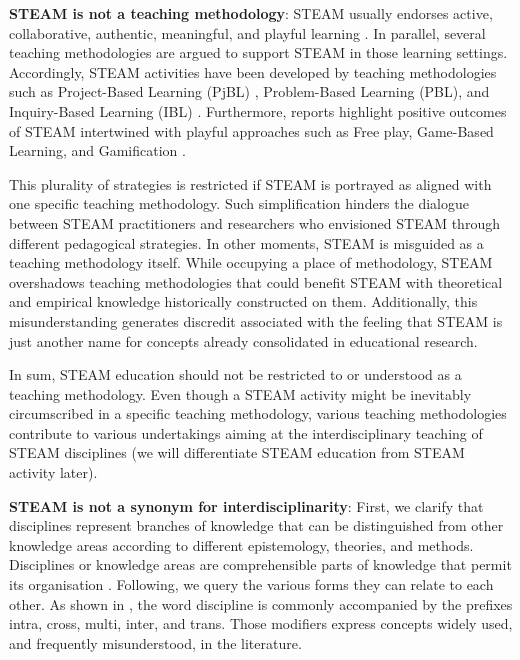 \documentclass[english]{textolivre}
\begin{document}
\textbf{STEAM is not a teaching methodology}: STEAM usually endorses active, collaborative, authentic, meaningful, and playful learning \cite{michael_wheres_2006, zosh_accessing_2018}. In parallel, several teaching methodologies are argued to support STEAM in those learning settings. Accordingly, STEAM activities have been developed by teaching methodologies such as Project-Based Learning (PjBL) \cite{lu_project-based_2022}, Problem-Based Learning (PBL), and Inquiry-Based Learning (IBL) \cite{quigley_developing_2017}. Furthermore, reports highlight positive outcomes of STEAM intertwined with playful approaches such as Free play, Game-Based Learning, and Gamification \cite{aurava_expectations_2022, rodrigues2022aamatematicas}.

This plurality of strategies is restricted if STEAM is portrayed as aligned with one specific teaching methodology. Such simplification hinders the dialogue between STEAM practitioners and researchers who envisioned STEAM through different pedagogical strategies. In other moments, STEAM is misguided as a teaching methodology itself. While occupying a place of methodology, STEAM overshadows teaching methodologies that could benefit STEAM with theoretical and empirical knowledge historically constructed on them. Additionally, this misunderstanding generates discredit associated with the feeling that STEAM is just another name for concepts already consolidated in educational research.

In sum, STEAM education should not be restricted to or understood as a teaching methodology. Even though a STEAM activity might be inevitably circumscribed in a specific teaching methodology, various teaching methodologies contribute to various undertakings aiming at the interdisciplinary teaching of STEAM disciplines (we will differentiate STEAM education from STEAM activity later).

\textbf{STEAM is not a synonym for interdisciplinarity}: First, we clarify that disciplines represent branches of knowledge that can be distinguished from other knowledge areas according to different epistemology, theories, and methods. Disciplines or knowledge areas are comprehensible parts of knowledge that permit its organisation \cite{florentino_disciplinaridade_2015}. Following, we query the various forms they can relate to each other. As shown in , the word discipline is commonly accompanied by the prefixes intra, cross, multi, inter, and trans. Those modifiers express concepts widely used, and frequently misunderstood, in the literature.
\end{document}
